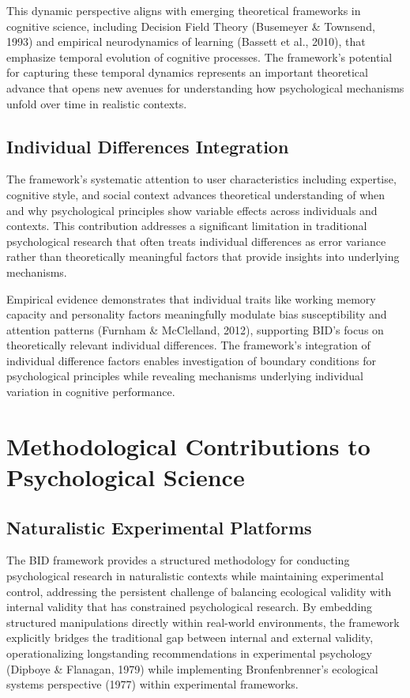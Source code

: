 \documentclass[
  authoryear,
  preprint]{elsarticle}
\begin{document}
This dynamic perspective aligns with emerging theoretical frameworks in
cognitive science, including Decision Field Theory (Busemeyer \&
Townsend, 1993) and empirical neurodynamics of learning (Bassett et al.,
2010), that emphasize temporal evolution of cognitive processes. The
framework's potential for capturing these temporal dynamics represents
an important theoretical advance that opens new avenues for
understanding how psychological mechanisms unfold over time in realistic
contexts.

\subsection{Individual Differences
Integration}\label{individual-differences-integration}

The framework's systematic attention to user characteristics including
expertise, cognitive style, and social context advances theoretical
understanding of when and why psychological principles show variable
effects across individuals and contexts. This contribution addresses a
significant limitation in traditional psychological research that often
treats individual differences as error variance rather than
theoretically meaningful factors that provide insights into underlying
mechanisms.

Empirical evidence demonstrates that individual traits like working
memory capacity and personality factors meaningfully modulate bias
susceptibility and attention patterns (Furnham \& McClelland, 2012),
supporting BID's focus on theoretically relevant individual differences.
The framework's integration of individual difference factors enables
investigation of boundary conditions for psychological principles while
revealing mechanisms underlying individual variation in cognitive
performance.

\section{Methodological Contributions to Psychological
Science}\label{methodological-contributions-to-psychological-science}

\subsection{Naturalistic Experimental
Platforms}\label{naturalistic-experimental-platforms}

The BID framework provides a structured methodology for conducting
psychological research in naturalistic contexts while maintaining
experimental control, addressing the persistent challenge of balancing
ecological validity with internal validity that has constrained
psychological research. By embedding structured manipulations directly
within real-world environments, the framework explicitly bridges the
traditional gap between internal and external validity, operationalizing
longstanding recommendations in experimental psychology (Dipboye \&
Flanagan, 1979) while implementing Bronfenbrenner's ecological systems
perspective (1977) within experimental frameworks.
\end{document}
